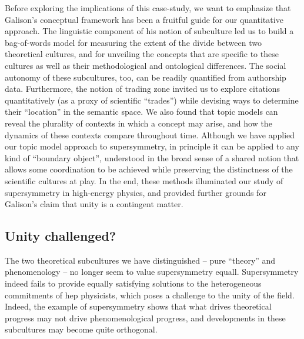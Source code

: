 \documentclass[smallextended]{svjour3}
\begin{document}
Before exploring the implications of this case-study, we want to emphasize that Galison's conceptual framework has been a fruitful guide for our quantitative approach. The linguistic component of his notion of subculture led us to build a bag-of-words model for measuring the extent of the divide between two theoretical cultures, and for unveiling the concepts that are specific to these cultures as well as their methodological and ontological differences. The social autonomy of these subcultures, too, can be readily quantified from authorship data. Furthermore, the notion of trading zone invited us to explore citations quantitatively (as a proxy of scientific ``trades'') while devising ways to determine their ``location'' in the semantic space. We also found that topic models can reveal the plurality of contexts in which a concept may arise, and how the dynamics of these contexts compare throughout time. Although we have applied our topic model approach to supersymmetry, in principle it can be applied to any kind of ``boundary object'', understood in the broad sense of a shared notion that allows some coordination to be achieved while preserving the distinctness of the scientific cultures at play. In the end, these methods illuminated our study of supersymmetry in high-energy physics, and provided further grounds for Galison's claim that unity is a contingent matter. 


\subsection{Unity challenged?}

  

The two theoretical subcultures we have distinguished -- pure ``theory'' and phenomenology -- no longer seem to value supersymmetry equall. Supersymmetry indeed fails to provide equally satisfying solutions to the heterogeneous commitments of \gls{hep} physicists, which poses a challenge to the unity of the field. Indeed, the example of supersymmetry shows that what drives theoretical progress may not drive phenomenological progress, and developments in these subcultures may become quite orthogonal.
\end{document}
